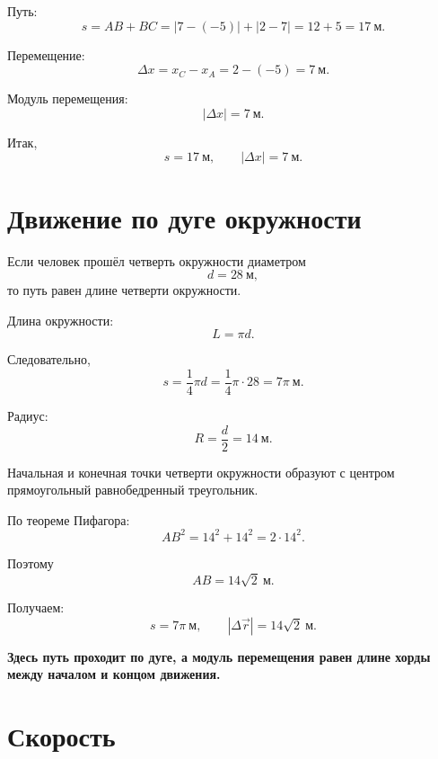\documentclass[a4paper,12pt]{article}
\newcommand{\important}[1]{\textbf{#1}}
\begin{document}
Путь:
\[
s=AB+BC=|7-(-5)|+|2-7|=12+5=17~\text{м}.
\]

Перемещение:
\[
\Delta x=x_C-x_A=2-(-5)=7~\text{м}.
\]

Модуль перемещения:
\[
|\Delta x|=7~\text{м}.
\]

Итак,
\[
\boxed{s=17~\text{м}},\qquad
\boxed{|\Delta x|=7~\text{м}}.
\]

\section{Движение по дуге окружности}

Если человек прошёл четверть окружности диаметром
\[
d=28~\text{м},
\]
то путь равен длине четверти окружности.

Длина окружности:
\[
L=\pi d.
\]

Следовательно,
\[
s=\frac14\pi d
 =\frac14\pi\cdot 28
 =7\pi~\text{м}.
\]

Радиус:
\[
R=\frac d2=14~\text{м}.
\]

Начальная и конечная точки четверти окружности образуют с центром прямоугольный равнобедренный треугольник.

\begin{center}
\end{center}

По теореме Пифагора:
\[
AB^2=14^2+14^2=2\cdot14^2.
\]

Поэтому
\[
AB=14\sqrt2~\text{м}.
\]

Получаем:
\[
\boxed{s=7\pi~\text{м}},
\qquad
\boxed{|\Delta\vec r|=14\sqrt2~\text{м}}.
\]

\important{Здесь путь проходит по дуге, а модуль перемещения равен длине хорды между началом и концом движения.}

\section{Скорость}
\end{document}
